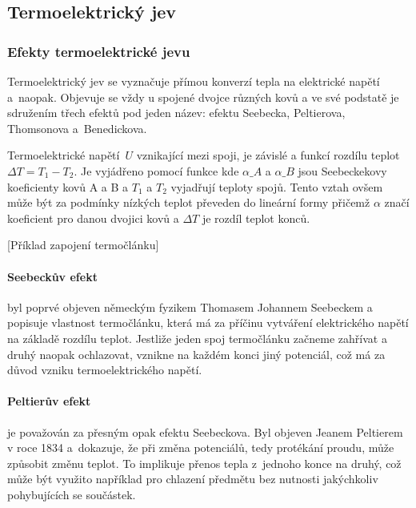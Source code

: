 \subsection{Termoelektrický jev}
\subsubsection{Efekty termoelektrické jevu}
Termoelektrický jev se vyznačuje přímou konverzí tepla na elektrické napětí
a~naopak. Objevuje se vždy u spojené dvojce různých kovů a ve své podstatě je
sdružením třech efektů pod jeden název: efektu Seebecka, Peltierova, Thomsonova
a~Benedickova. \cite{praktikum}\cite{diplomka}

Termoelektrické napětí~$U$ vznikající mezi spoji, je závislé a funkcí rozdílu
teplot~$\Delta T = T_1 - T_2$. Je vyjádřeno pomocí funkce
kde $\alpha\_A$ a $\alpha\_B$ jsou Seebeckekovy koeficienty kovů A a B a $T_1$
a $T_2$ vyjadřují teploty spojů.  Tento vztah ovšem může být za podmínky
nízkých teplot převeden do lineární formy
přičemž $\alpha$ značí koeficient pro danou dvojici kovů a $\Delta T$ je rozdíl
teplot konců.\cite{diplomka}

[Příklad zapojení termočlánku]

\paragraph{Seebeckův efekt} byl poprvé objeven německým fyzikem Thomasem
Johannem Seebeckem a popisuje vlastnost termočlánku, která má za příčinu
vytváření elektrického napětí na základě rozdílu teplot. Jestliže jeden spoj
termočlánku začneme zahřívat a druhý naopak ochlazovat, vznikne na každém konci
jiný potenciál, což má za důvod vzniku termoelektrického napětí.
\cite{jreichl-seebeck}

\paragraph{Peltierův efekt} je považován za přesným opak efektu Seebeckova. Byl
objeven Jeanem Peltierem v roce 1834 a~dokazuje, že při změna potenciálů, tedy
protékání proudu, může způsobit změnu teplot. To implikuje přenos tepla
z~jednoho konce na druhý, což může být využito například pro chlazení předmětu
bez nutnosti jakýchkoliv pohybujících se součástek.\cite{peltier}

